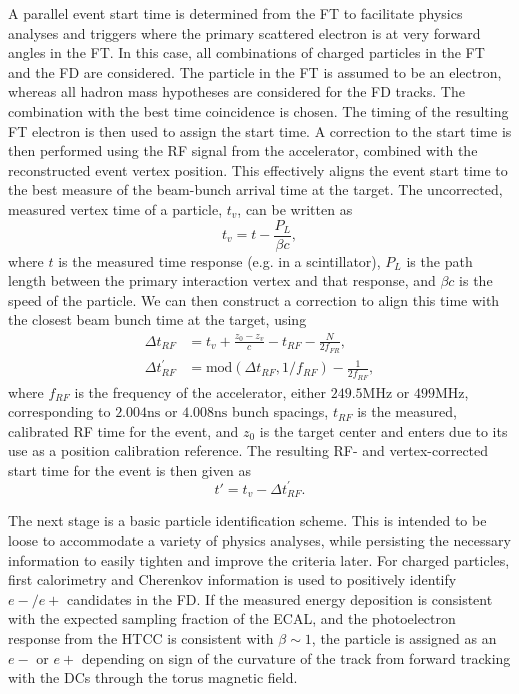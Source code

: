     A parallel event start time is determined from the FT to facilitate physics analyses and triggers where the primary scattered electron is at very forward angles in the FT.
    In this case, all combinations of charged particles in the FT and the FD are considered.
    The particle in the FT is assumed to be an electron, whereas all hadron mass hypotheses are considered for the FD tracks.
    The combination with the best time coincidence is chosen.
    The timing of the resulting FT electron is then used to assign the start time.
    A correction to the start time is then performed using the RF signal from the accelerator, combined with the reconstructed event vertex position.
    This effectively aligns the event start time to the best measure of the beam-bunch arrival time at the target.
    The uncorrected, measured vertex time of a particle, $t_v$, can be written as
    \begin{equation*}
        t_v = t - \frac{P_L}{\beta c},
    \end{equation*}
    where $t$ is the measured time response (e.g. in a scintillator), $P_L$ is the path length between the primary interaction vertex and that response, and $\beta c$ is the speed of the particle.
    We can then construct a correction to align this time with the closest beam bunch time at the target, using
    \begin{align*}
        \Delta t_{RF} &= t_v + \frac{z_0 - z_v}{c} - t_{RF} - \frac{N}{2f_{FR}}, \\
        \Delta t^\prime_{RF} &= \text{mod}(\Delta t_{RF}, 1/f_{RF}) - \frac{1}{2f_{RF}},
    \end{align*} %
    where $f_{RF}$ is the frequency of the accelerator, either $249.5 \text{MHz}$ or $499 \text{MHz}$, corresponding to $2.004 \text{ns}$ or $4.008 \text{ns}$ bunch spacings, $t_{RF}$ is the measured, calibrated RF time for the event, and $z_0$ is the target center and enters due to its use as a position calibration reference.
    The resulting RF- and vertex-corrected start time for the event is then given as
    \begin{equation*}
        t' = t_v - \Delta t^\prime_{RF}.
    \end{equation*}

    The next stage is a basic particle identification scheme.
    This is intended to be loose to accommodate a variety of physics analyses, while persisting the necessary information to easily tighten and improve the criteria later.
    For charged particles, first calorimetry and Cherenkov information is used to positively identify $e-/e+$ candidates in the FD.
    If the measured energy deposition is consistent with the expected sampling fraction of the ECAL, and the photoelectron response from the HTCC is consistent with $\beta \sim 1$, the particle is assigned as an $e-$ or $e+$ depending on sign of the curvature of the track from forward tracking with the DCs through the torus magnetic field.

